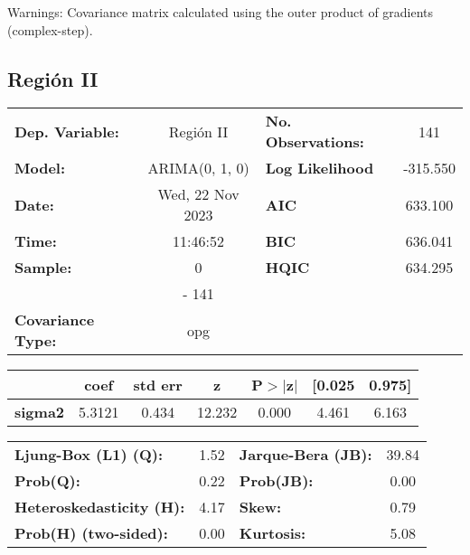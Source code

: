 \documentclass{article}%
\begin{document}
Warnings: \newline
 [1] Covariance matrix calculated using the outer product of gradients (complex-step).%
\subsection*{Región II}%
\begin{center}
\begin{tabular}{lclc}
\toprule
\textbf{Dep. Variable:}          &    Región II     & \textbf{  No. Observations:  } &    141      \\
\textbf{Model:}                  &  ARIMA(0, 1, 0)  & \textbf{  Log Likelihood     } &  -315.550   \\
\textbf{Date:}                   & Wed, 22 Nov 2023 & \textbf{  AIC                } &  633.100    \\
\textbf{Time:}                   &     11:46:52     & \textbf{  BIC                } &  636.041    \\
\textbf{Sample:}                 &        0         & \textbf{  HQIC               } &  634.295    \\
\textbf{}                        &       - 141      & \textbf{                     } &             \\
\textbf{Covariance Type:}        &       opg        & \textbf{                     } &             \\
\bottomrule
\end{tabular}
\begin{tabular}{lcccccc}
                & \textbf{coef} & \textbf{std err} & \textbf{z} & \textbf{P$> |$z$|$} & \textbf{[0.025} & \textbf{0.975]}  \\
\midrule
\textbf{sigma2} &       5.3121  &        0.434     &    12.232  &         0.000        &        4.461    &        6.163     \\
\bottomrule
\end{tabular}
\begin{tabular}{lclc}
\textbf{Ljung-Box (L1) (Q):}     & 1.52 & \textbf{  Jarque-Bera (JB):  } & 39.84  \\
\textbf{Prob(Q):}                & 0.22 & \textbf{  Prob(JB):          } &  0.00  \\
\textbf{Heteroskedasticity (H):} & 4.17 & \textbf{  Skew:              } &  0.79  \\
\textbf{Prob(H) (two-sided):}    & 0.00 & \textbf{  Kurtosis:          } &  5.08  \\
\bottomrule
\end{tabular}
\end{center}
\end{document}
